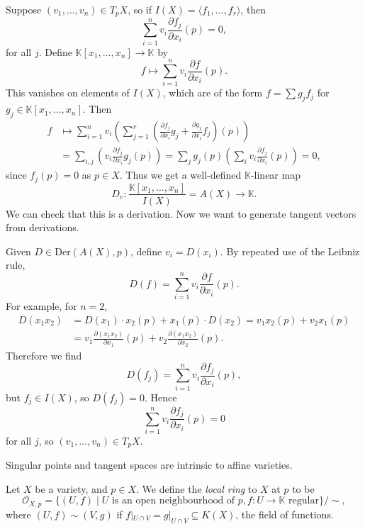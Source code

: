 \documentclass[12pt]{article}
\begin{document}
\begin{proofbox}
	Suppose $(v_1, \ldots, v_n) \in T_pX$, so if $I(X) = \langle f_1, \ldots, f_r\rangle$, then
	\[
	\sum_{i = 1}^n v_i \frac{\partial f_j}{\partial x_i}(p) = 0,
	\]
	for all $j$. Define $\mathbb{K}[x_1, \ldots, x_n] \to \mathbb{K}$ by
	\[
	f \mapsto \sum_{i= 1}^n v_i \frac{\partial f}{\partial x_i}(p).
	\]
	This vanishes on elements of $I(X)$, which are of the form $f = \sum g_j f_j$ for $g_j \in \mathbb{K}[x_1, \ldots, x_n]$. Then
	\begin{align*}
		f &\mapsto \sum_{i = 1}^n v_i \left( \sum_{j = 1}^r \left( \frac{\partial f_j}{\partial x_i} g_j + \frac{\partial g_j}{\partial x_i} f_j \right) (p) \right) \\
		  &= \sum_{i, j} \left( v_i \frac{\partial f_j}{\partial x_i} g_j(p) \right) = \sum_{j} g_j(p) \left( \sum_{i} v_i \frac{\partial f_j}{\partial x_i} (p) \right) = 0,
	\end{align*}
	since $f_j(p) = 0$ as $p \in X$. Thus we get a well-defined $\mathbb{K}$-linear map
	\[
		D_v : \frac{\mathbb{K}[x_1, \ldots, x_n]}{I(X)} = A(X) \to \mathbb{K}.
	\]
	We can check that this is a derivation. Now we want to generate tangent vectors from derivations.

	Given $D \in \mathrm{Der}(A(X), p)$, define $v_i = D(x_i)$. By repeated use of the Leibniz rule,
	\[
	D(f) = \sum_{i = 1}^n v_i \frac{\partial f}{\partial x_i}(p).
	\]
	For example, for $n = 2$,
	\begin{align*}
		D(x_1 x_2) &= D(x_1) \cdot x_2(p) + x_1(p) \cdot D(x_2) = v_1 x_2(p) + v_2 x_1(p) \\\
			   &= v_1 \frac{\partial (x_1 x_2)}{\partial x_1}(p) + v_2 \frac{\partial (x_1 x_2)}{\partial x_2}(p).
	\end{align*}
	Therefore we find
	\[
	D(f_j) = \sum_{i = 1}^n v_i \frac{\partial f_j}{\partial x_i}(p),
	\]
	but $f_j \in I(X)$, so $D(f_j) = 0$. Hence
	\[
	\sum_{i = 1}^n v_i \frac{\partial f_j}{\partial x_i}(p) = 0
	\]
	for all $j$, so $(v_1, \ldots, v_n) \in T_pX$.
\end{proofbox}

\begin{remark}
	Singular points and tangent spaces are intrinsic to affine varieties.
\end{remark}

\begin{definition}
	Let $X$ be a variety, and $p \in X$. We define the \emph{local ring} to $X$ at $p$ to be
	\[
		\mathcal{O}_{X, p} = \{(U, f) \mid U \text{ is an open neighbourhood of } p, f: U \to \mathbb{K} \text{ regular}\} / \sim,
	\]
	where $(U, f) \sim (V, g)$ if $f|_{U \cap V} = g|_{U \cap V}\subseteq K(X)$, the field of functions.
\end{definition}
\end{document}
